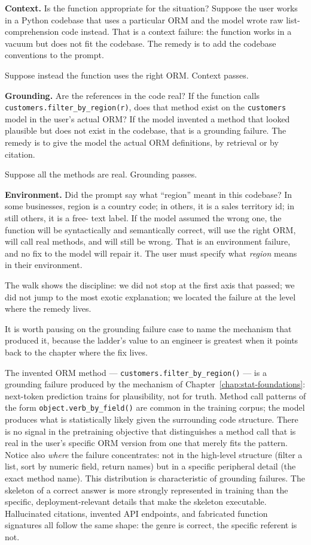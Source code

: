 \textbf{Context.} Is the function appropriate for the situation?
Suppose the user works in a Python codebase that uses a particular
ORM and the model wrote raw list-comprehension code instead. That
is a context failure: the function works in a vacuum but does not
fit the codebase. The remedy is to add the codebase conventions
to the prompt.

Suppose instead the function uses the right ORM. Context passes.

\textbf{Grounding.} Are the references in the code real? If the
function calls \texttt{customers.filter\_by\_region(r)}, does that
method exist on the \texttt{customers} model in the user's actual
ORM? If the model invented a method that looked plausible but does
not exist in the codebase, that is a grounding failure. The remedy
is to give the model the actual ORM definitions, by retrieval or
by citation.

Suppose all the methods are real. Grounding passes.

\textbf{Environment.} Did the prompt say what ``region'' meant in
this codebase? In some businesses, region is a country code; in
others, it is a sales territory id; in still others, it is a free-
text label. If the model assumed the wrong one, the function will
be syntactically and semantically correct, will use the right ORM,
will call real methods, and will still be wrong. That is an
environment failure, and no fix to the model will repair it. The
user must specify what \emph{region} means in their environment.

The walk shows the discipline: we did not stop at the first axis
that passed; we did not jump to the most exotic explanation; we
located the failure at the level where the remedy lives.

It is worth pausing on the grounding failure case to name the
mechanism that produced it, because the ladder's value to an
engineer is greatest when it points back to the chapter where the
fix lives.

The invented ORM method --- \texttt{customers.filter\_by\_region()}
--- is a grounding failure produced by the mechanism of Chapter~\ref{chap:stat-foundations}:
next-token prediction trains for plausibility, not for truth.
Method call patterns of the form \texttt{object.verb\_by\_field()}
are common in the training corpus; the model produces what is
statistically likely given the surrounding code structure.
There is no signal in the pretraining objective that distinguishes
a method call that is real in the user's specific ORM version from
one that merely fits the pattern. Notice also \emph{where} the
failure concentrates: not in the high-level structure (filter a
list, sort by numeric field, return names) but in a specific
peripheral detail (the exact method name). This distribution is
characteristic of grounding failures. The skeleton of a correct
answer is more strongly represented in training than the specific,
deployment-relevant details that make the skeleton executable.
Hallucinated citations, invented API endpoints, and fabricated
function signatures all follow the same shape: the genre is correct,
the specific referent is not.

